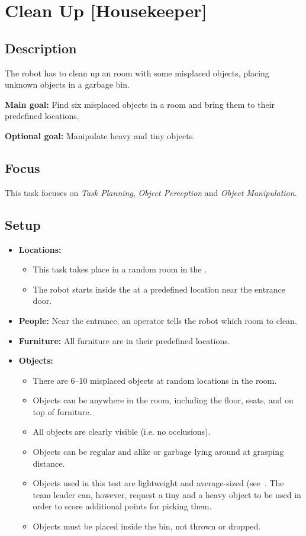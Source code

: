 \section{Clean Up [Housekeeper]}
\label{test:clean-up}

\subsection*{Description}
	The robot has to clean up an \Arena{} room with some misplaced objects, placing unknown objects in a garbage bin.

\textbf{Main goal:}
	Find six misplaced objects in a room and bring them to their predefined locations.

\textbf{Optional goal:}
	Manipulate heavy and tiny objects.

\subsection*{Focus}
	This task focuses on 
	\textit{Task Planning},
	\textit{Object Perception} and
	\textit{Object Manipulation}.

\subsection*{Setup}
\begin{itemize}[nosep]	
	\item \textbf{Locations:} 
		\begin{itemize}
			\item This task takes place in a random room in the \Arena{}.
			\item The robot starts inside the \Arena{} at a predefined location near the entrance door.
		\end{itemize}
	\item \textbf{People:} Near the entrance, an operator tells the robot which room to clean.
	\item \textbf{Furniture:} All furniture are in their predefined locations.
	\item \textbf{Objects:} 
		\begin{itemize}
			\item There are 6--10 misplaced objects at random locations in the room.
			\item Objects can be anywhere in the room, including the floor, seats, and on top of furniture.
			\item All objects are clearly visible (i.e. no occlusions).
			\item Objects can be regular and alike or garbage lying around at grasping distance.
			\item Objects used in this test are lightweight and average-sized (see~. The team leader can, however, request a tiny and a heavy object to be used in order to score additional points for picking them.
			\item Objects must be placed inside the bin, not thrown or dropped.
		\end{itemize}
\end{itemize}

